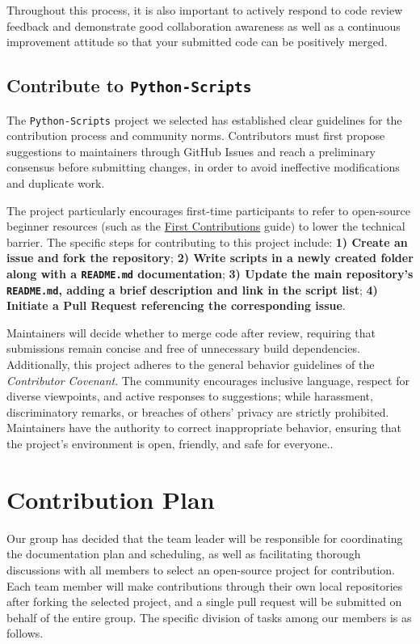 \documentclass[12pt]{article}
\begin{document}
Throughout this process, it is also important to actively respond to code review feedback and demonstrate good collaboration awareness as well as a continuous improvement attitude so that your submitted code can be positively merged.

\subsection{Contribute to \texttt{Python-Scripts}}

The \texttt{Python-Scripts} project we selected has established clear guidelines for the contribution process and community norms. Contributors must first propose suggestions to maintainers through GitHub Issues and reach a preliminary consensus before submitting changes, in order to avoid ineffective modifications and duplicate work. 

The project particularly encourages first-time participants to refer to open-source beginner resources (such as the \href{https://firstcontributions.github.io/}{First Contributions} guide) to lower the technical barrier. The specific steps for contributing to this project include: \textbf{1) Create an issue and fork the repository}; \textbf{2) Write scripts in a newly created folder along with a \texttt{README.md} documentation}; \textbf{3) Update the main repository's \texttt{README.md}, adding a brief description and link in the script list}; \textbf{4) Initiate a Pull Request referencing the corresponding issue}. 

Maintainers will decide whether to merge code after review, requiring that submissions remain concise and free of unnecessary build dependencies. Additionally, this project adheres to the general behavior guidelines of the \textit{Contributor Covenant}. The community encourages inclusive language, respect for diverse viewpoints, and active responses to suggestions; while harassment, discriminatory remarks, or breaches of others' privacy are strictly prohibited. Maintainers have the authority to correct inappropriate behavior, ensuring that the project's environment is open, friendly, and safe for everyone..



\section{Contribution Plan}

Our group has decided that the team leader will be responsible for coordinating the documentation plan and scheduling, as well as facilitating thorough discussions with all members to select an open-source project for contribution. Each team member will make contributions through their own local repositories after forking the selected project, and a single pull request will be submitted on behalf of the entire group. The specific division of tasks among our members is as follows.
\end{document}

